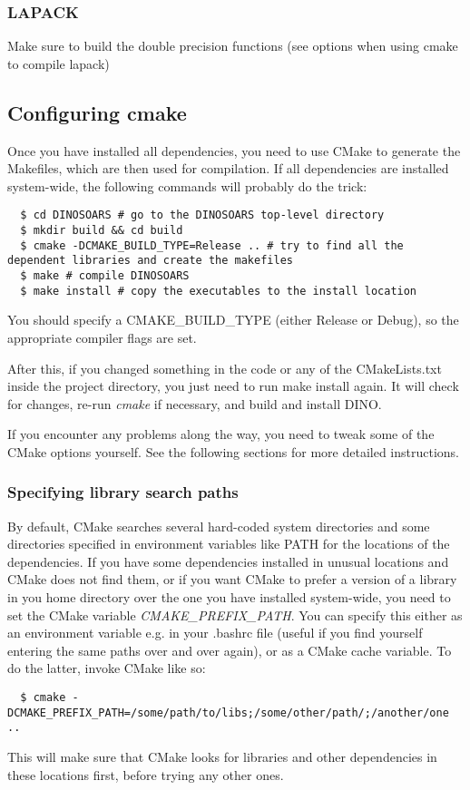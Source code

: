 \subsubsection{LAPACK}
Make sure to build the double precision functions (see options when using cmake to compile lapack)

\subsection{Configuring cmake}
Once you have installed all dependencies, you need to use CMake to generate the Makefiles, which are then used for compilation. If all dependencies are installed system-wide, the following commands will probably do the trick:
\begin{lstlisting}
  $ cd DINOSOARS # go to the DINOSOARS top-level directory
  $ mkdir build && cd build
  $ cmake -DCMAKE_BUILD_TYPE=Release .. # try to find all the dependent libraries and create the makefiles
  $ make # compile DINOSOARS
  $ make install # copy the executables to the install location
\end{lstlisting}
You should specify a CMAKE\_BUILD\_TYPE (either Release or Debug), so the appropriate compiler flags are set.

After this, if you changed something in the code or any of the CMakeLists.txt inside the project directory, you just need to run make install again. It will check for changes, re-run \textit{cmake} if necessary, and build and install DINO.

If you encounter any problems along the way, you need to tweak some of the CMake options yourself. See the following sections for more detailed instructions.

\subsubsection{Specifying library search paths}
By default, CMake searches several hard-coded system directories and some directories specified in environment variables like PATH for the locations of the dependencies. If you have some dependencies installed in unusual locations and CMake does not find them, or if you want CMake to prefer a version of a library in you home directory over the one you have installed system-wide, you need to set the CMake variable \textit{CMAKE\_PREFIX\_PATH}. You can specify this either as an environment variable e.g. in your .bashrc file (useful if you find yourself entering the same paths over and over again), or as a CMake cache variable. To do the latter, invoke CMake like so:
\begin{lstlisting}
  $ cmake -DCMAKE_PREFIX_PATH=/some/path/to/libs;/some/other/path/;/another/one ..
\end{lstlisting}
This will make sure that CMake looks for libraries and other dependencies in these locations first, before trying any other ones.

